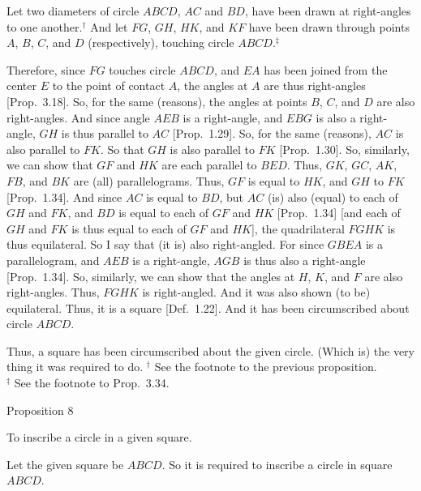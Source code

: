 \epsfysize=2.2in
\centerline{}

Let two diameters of circle $ABCD$,  $AC$ and $BD$,  have been drawn at right-angles to one another.$^\dag$
And let $FG$, $GH$, $HK$, and $KF$ have been drawn through points $A$, $B$, $C$, and
$D$ (respectively), touching circle $ABCD$.$^\ddag$

Therefore, since $FG$ touches circle $ABCD$, and $EA$ has been joined from the
center $E$ to the point of contact $A$, the angles at $A$ are thus  right-angles  
[Prop.~3.18]. So, for the same (reasons), the angles at points $B$, $C$, and $D$ are also
right-angles. And since angle $AEB$ is a right-angle, and $EBG$ is also a right-angle, $GH$ is thus parallel to $AC$ [Prop.~1.29]. So, for the same
(reasons), $AC$ is also parallel to $FK$. So that $GH$ is also parallel to
$FK$ [Prop.~1.30]. So, similarly, we can show that $GF$ and $HK$ are each parallel to
$BED$. Thus, $GK$, $GC$, $AK$, $FB$, and $BK$ are (all) parallelograms. Thus, 
$GF$ is equal to $HK$, and $GH$ to $FK$ [Prop.~1.34]. And since
$AC$ is equal to $BD$, but $AC$ (is) also (equal) to each of $GH$ and $FK$,
and $BD$ is equal to each of $GF$ and $HK$ [Prop.~1.34] [and each of $GH$ and $FK$ is thus equal to each of $GF$ and $HK$], the quadrilateral $FGHK$ is
thus equilateral.  So I say that (it is) also right-angled. For since $GBEA$
is a parallelogram, and $AEB$ is a right-angle, $AGB$ is thus also a right-angle [Prop.~1.34]. So, similarly, we can show that the angles at $H$, $K$, and
$F$ are also right-angles. Thus, $FGHK$ is right-angled. And it was also shown
(to be) equilateral. Thus,  it is a square [Def.~1.22].
And it has been circumscribed about circle $ABCD$.

Thus, a square has been circumscribed about the given circle. (Which is)
the very thing it was required to do.
{\footnotesize \noindent$^\dag$ See the footnote to the previous
 proposition.\\
 $^\ddag$ See the footnote
to Prop.~3.34.}\\


\begin{center}
{\large Proposition 8}
\end{center}

To inscribe a circle in a given square.

Let the given square be $ABCD$. So it is required to inscribe a circle in
square $ABCD$.

